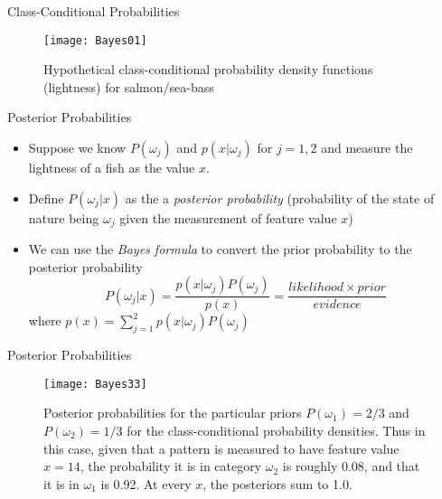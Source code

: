 \begin{frame}{Class-Conditional Probabilities}
\begin{figure}
\texttt{[image: Bayes01]}
\caption{Hypothetical class-conditional probability density functions (lightness) for salmon/sea-bass}
\end{figure}
\end{frame}

\begin{frame}{Posterior Probabilities}
\begin{itemize}
\item Suppose we know $P(\omega_j)$ and $p(x|\omega_j)$ for $j=1,2$ and measure the lightness of a fish as the value $x$.
\item Define $P(\omega_j|x)$ as the a \textit{\color{mycolor1}posterior probability} (probability of the state of nature being $\omega_j$ given the measurement of feature value $x$)
\item We can use the \textit{\color{mycolor1}Bayes formula} to convert the prior probability to the posterior probability
\begin{equation}
\boxed{P({\omega_j}|x) = \frac{{p(x|{\omega_j})P({\omega_j})}}{{p(x)}} = \frac{{likelihood \times prior}}{{evidence}}\nonumber}
\end{equation}
where $p(x) = \sum\limits_{j = 1}^2 {p(x|{\omega_j})P({\omega_j})} $
\end{itemize}
\end{frame}

\begin{frame}{Posterior Probabilities}
\begin{figure}
\texttt{[image: Bayes33]}
\caption{ Posterior probabilities for the particular priors $P(\omega_1) = 2/3$ and $P(\omega_2 ) =1/3$ for the class-conditional probability densities. Thus in this case,
given that a pattern is measured to have feature value $x = 14$, the probability it is in category $\omega_2$ is roughly 0.08, and that it is in $\omega_1$ is 0.92. At every $x$, the posteriors
sum to 1.0.}
\end{figure}
\end{frame}

